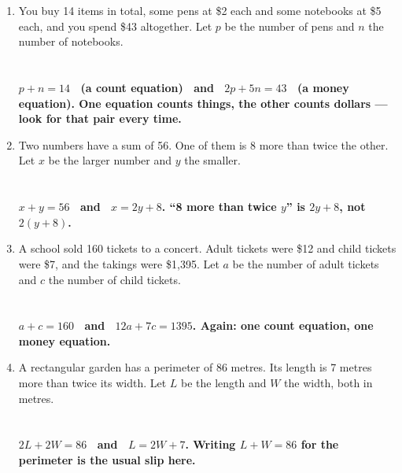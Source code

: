 \documentclass[11pt,a4paper]{article}
\newcommand{\ans}[1]{\ {\color{keyred}\bfseries #1}}
\newcommand{\ans}[1]{}
\begin{document}
\begin{enumerate}[leftmargin=20pt,itemsep=11pt]
\item You buy 14 items in total, some pens at \$2 each and some notebooks at \$5 each, and you spend \$43 altogether. Let $p$ be the number of pens and $n$ the number of notebooks.\\
  \underline{\hspace{\linewidth}}\\[4pt]
  \underline{\hspace{\linewidth}}
  \ans{\\ $p+n=14$ \ (a count equation) \ and \ $2p+5n=43$ \ (a money equation). One equation counts things, the other counts dollars --- look for that pair every time.}

\item Two numbers have a sum of 56. One of them is 8 more than twice the other. Let $x$ be the larger number and $y$ the smaller.\\
  \underline{\hspace{\linewidth}}\\[4pt]
  \underline{\hspace{\linewidth}}
  \ans{\\ $x+y=56$ \ and \ $x=2y+8$. ``8 more than twice $y$'' is $2y+8$, not $2(y+8)$.}

\item A school sold 160 tickets to a concert. Adult tickets were \$12 and child tickets were \$7, and the takings were \$1{,}395. Let $a$ be the number of adult tickets and $c$ the number of child tickets.\\
  \underline{\hspace{\linewidth}}\\[4pt]
  \underline{\hspace{\linewidth}}
  \ans{\\ $a+c=160$ \ and \ $12a+7c=1395$. Again: one count equation, one money equation.}

\item A rectangular garden has a perimeter of 86 metres. Its length is 7 metres more than twice its width. Let $L$ be the length and $W$ the width, both in metres.\\
  \underline{\hspace{\linewidth}}\\[4pt]
  \underline{\hspace{\linewidth}}
  \ans{\\ $2L+2W=86$ \ and \ $L=2W+7$. Writing $L+W=86$ for the perimeter is the usual slip here.}


\end{enumerate}
\end{document}
